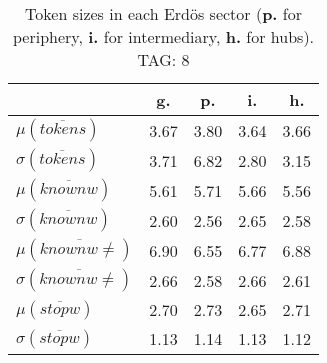 \begin{table}[h!]
\begin{center}
\begin{tabular}{| l | c | c | c | c |}\hline
 & g. & p. & i. & h. \\\hline
$\mu(\overline{tokens})$ & 3.67  & 3.80  & 3.64  & 3.66 \\\hline
$\sigma(\overline{tokens})$ & 3.71  & 6.82  & 2.80  & 3.15 \\\hline
$\mu(\overline{knownw})$ & 5.61  & 5.71  & 5.66  & 5.56 \\\hline
$\sigma(\overline{knownw})$ & 2.60  & 2.56  & 2.65  & 2.58 \\\hline
$\mu(\overline{knownw \neq})$ & 6.90  & 6.55  & 6.77  & 6.88 \\\hline
$\sigma(\overline{knownw \neq})$ & 2.66  & 2.58  & 2.66  & 2.61 \\\hline
$\mu(\overline{stopw})$ & 2.70  & 2.73  & 2.65  & 2.71 \\\hline
$\sigma(\overline{stopw})$ & 1.13  & 1.14  & 1.13  & 1.12 \\\hline
\end{tabular}
\caption{Token sizes in each Erd\"os sector ({{\bf p.}} for periphery, {{\bf i.}} for intermediary, {{\bf h.}} for hubs). TAG: 8}
\end{center}
\end{table}